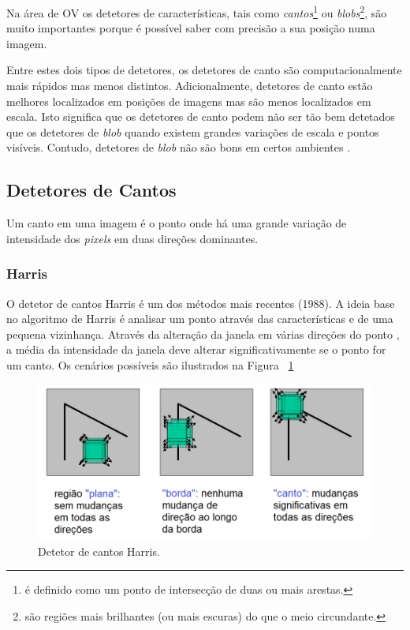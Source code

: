 Na área de OV os detetores de características, tais como \textit{cantos}\footnote{é definido como um ponto de intersecção de duas ou mais arestas.} ou \textit{blobs}\footnote{são regiões mais brilhantes (ou mais escuras) do que o meio circundante.}, são muito importantes porque é possível saber com precisão a sua posição numa imagem. 

Entre estes dois tipos de detetores, os detetores de canto são computacionalmente mais rápidos mas menos distintos. Adicionalmente, detetores de canto estão melhores localizados em posições de imagens mas são menos localizados em escala. Isto significa que os detetores de canto podem não ser tão bem detetados que os detetores de \textit{blob} quando existem grandes variações de escala e pontos visíveis. Contudo, detetores de \textit{blob} não são bons em certos ambientes \cite{Fraundorfer2012}.

\subsection{Detetores de Cantos}

Um canto em uma imagem é o ponto onde há uma grande variação de intensidade dos \textit{pixels} em duas direções dominantes. 

\subsubsection{Harris}

O detetor de cantos Harris é um dos métodos mais recentes (1988). A ideia base no algoritmo de Harris é analisar um ponto através das características e de uma pequena vizinhança. Através da alteração da janela em várias direções do ponto , a média da intensidade da janela deve alterar significativamente se o ponto for um canto. Os cenários possíveis são ilustrados na Figura ~\ref{fig:harriscornerdetection}

\begin{figure}[h!]
	\centering
	\includegraphics[width=0.7\linewidth]{figures/HarrisCornerDetection}
	\caption{Detetor de cantos Harris. \cite{VisualOdometryRodasVehicles}}
	\label{fig:harriscornerdetection}
\end{figure}

